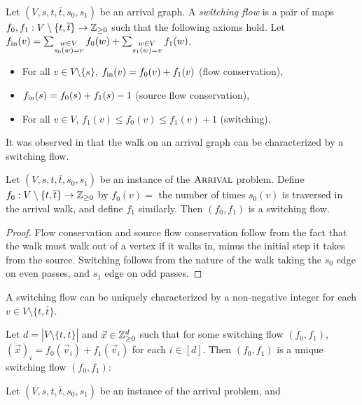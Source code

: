 \begin{definition}
  Let $(V, s, t, \overline{t}, s_0, s_1)$ be an arrival graph. A \emph{switching flow} is a pair of maps 
  $f_0, f_1 : V \setminus \{t, \overline{t}\} \to \mathbb{Z}_{\geq 0}$ such that the following axioms hold.
    Let $f_{\text{in}}(v) =
        \sum_{\substack{w \in V \\ s_0(w) = v}} f_0(w) 
        + \sum_{\substack{w \in V \\ s_1(w) = v}} f_1(w)$. 
  \begin{itemize}
    \item For all $v \in V \setminus \{s\}$, $f_{\text{in}}(v) = f_0(v) + f_1(v)$ (flow conservation),
    \item $f_{\text{in}}(s) = f_0(s) + f_1(s) - 1$ (source flow conservation),
    \item For all $v \in V$, $f_1(v) \leq f_0(v) \leq f_1(v) + 1$ (switching).
  \end{itemize}
  It was observed in \citep{arrivalBasic} that the walk on an arrival graph can be characterized
  by a switching flow.
  \begin{lemma}\label{walkSwitching}
    Let $(V, s, t, \overline{t}, s_0, s_1)$ be an instance of the $\textsc{Arrival}$ problem. Define
    $f_0 : V \setminus \{t, \overline{t}\} \to \mathbb{Z}_{\geq 0}$ by $f_0(v) =$ the number of times $s_0(v)$
    is traversed in the arrival walk, and define $f_1$ similarly. Then $(f_0, f_1)$ is a switching
    flow.
  \end{lemma}
  \begin{proof}
    Flow conservation and source flow conservation follow from the fact that the walk must walk
    out of a vertex if it walks in, minus the initial step it takes from the source. Switching
    follows from the nature of the walk taking the $s_0$ edge on even passes, and $s_1$ edge on odd
    passes.
  \end{proof}
  A switching flow can be uniquely characterized by a non-negative integer for each
  $v \in V \setminus \{t, \overline{t}\}$.
  \begin{lemma}
    Let $d = |V \setminus \{t, \overline{t}\}|$ and $\vec{x} \in \mathbb{Z}_{\geq 0}^{d}$ such that
    for some switching flow $(f_0, f_1)$, $(\vec{x})_i = f_0(\vec{v}_i) + f_1(\vec{v}_i)$ for each
    $i \in [d]$. Then $(f_0, f_1)$
    is a unique switching flow $(f_0, f_1) :$
  \end{lemma}
  \begin{definition}
    Let $(V, s, t, \overline{t}, s_0, s_1)$ be an instance of the arrival problem, and

\end{definition}
\end{definition}
